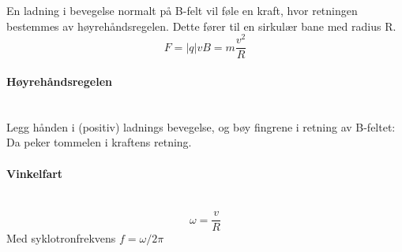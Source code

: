 En ladning i bevegelse normalt på B-felt vil føle en kraft,
hvor retningen bestemmes av høyrehåndsregelen.
Dette fører til en sirkulær bane med radius R.
$$F = |q|vB = m\frac{v^2}{R}$$



\paragraph{Høyrehåndsregelen} \hfill \\
Legg hånden i (positiv) ladnings bevegelse,
og bøy fingrene i retning av B-feltet:
Da peker tommelen i kraftens retning.



\paragraph{Vinkelfart} \hfill \\
$$\omega = \frac{v}{R}$$
Med syklotronfrekvens $f = \omega / 2\pi$

